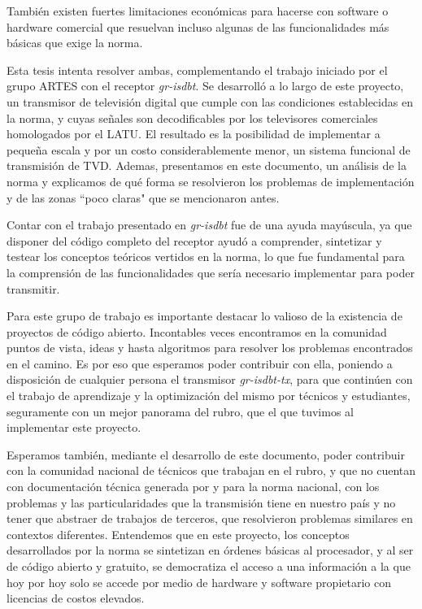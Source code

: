 También existen fuertes limitaciones económicas para hacerse con software o hardware comercial que resuelvan incluso algunas de las funcionalidades más básicas que exige la norma. 

Esta tesis intenta resolver ambas, complementando el trabajo iniciado por el grupo ARTES con el receptor \textit{gr-isdbt}. Se desarrolló a lo largo de este proyecto, un transmisor de televisión digital que cumple con las condiciones establecidas en la norma, y cuyas señales son decodificables por los televisores comerciales homologados por el LATU. El resultado es la posibilidad de implementar a pequeña escala y por un costo considerablemente menor, un sistema funcional de transmisión de TVD. Ademas, presentamos en este documento, un análisis de la norma y explicamos de qué forma se resolvieron los problemas de implementación y de las zonas ``poco claras" que se mencionaron antes.

Contar con el trabajo presentado en \textit{gr-isdbt} fue de una ayuda mayúscula, ya que disponer del código completo del receptor ayudó a comprender, sintetizar y testear los conceptos teóricos vertidos en la norma, lo que fue fundamental para la comprensión de las funcionalidades que sería necesario implementar para poder transmitir. 

Para este grupo de trabajo es importante destacar lo valioso de la existencia de proyectos de código abierto. Incontables veces encontramos en la comunidad puntos de vista, ideas y hasta algoritmos para resolver los problemas encontrados en el camino. Es por eso que esperamos poder contribuir con ella, poniendo a disposición de cualquier persona el transmisor \textit{gr-isdbt-tx}, para que continúen con el trabajo de aprendizaje y la optimización del mismo por técnicos y estudiantes, seguramente con un mejor panorama del rubro, que el que tuvimos al implementar este proyecto.

Esperamos también, mediante el desarrollo de este documento, poder contribuir con la comunidad nacional de técnicos que trabajan en el rubro, y que no cuentan con documentación técnica generada por y para la norma nacional, con los problemas y las particularidades que la transmisión tiene en nuestro país y no tener que abstraer de trabajos de terceros, que resolvieron problemas similares en contextos diferentes. Entendemos que en este proyecto, los conceptos desarrollados por la norma se sintetizan en órdenes básicas al procesador, y al ser de código abierto y gratuito, se democratiza el acceso a una información a la que hoy por hoy solo se accede por medio de hardware y software propietario con licencias de costos elevados.

